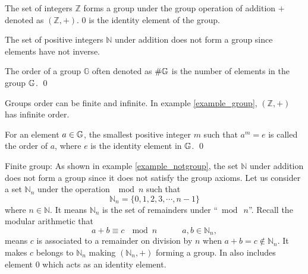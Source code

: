 \begin{example} \label{example_group}
	The set of integers $\mathbb{Z}$ forms a group under the group operation of addition $+$ denoted as $(\mathbb{Z},+)$. $0$ is the identity element of the group.
\end{example}
\begin{example}\label{example_notgroup}
	The set of positive integers $\mathbb{N}$ under addition does not form a group since elements have not inverse.
\end{example}
\begin{definition}\hspace{0em}
	The order of a group $\mathbb{G}$  often denoted as $\#\mathbb{G}\index{group}$ is the number of elements in the group $\mathbb{G}\index{group}$.
	\qed
\end{definition}

\begin{remark}
	Groups order can be finite and infinite. In example \ref{example_group}, $(\mathbb{Z},+)$ has infinite order.
\end{remark}

\begin{definition}
	For an element $a\in\mathbb{G}\index{group}$, the smallest positive integer $m$ such that $a^{m}=e$ is called the order of $a$, where $e$ is the identity element in $\mathbb{G}\index{group}$.
	\qed
\end{definition}

\begin{example}{Finite group:   } \label{definition_finite_group}
	As shown in example \ref{example_notgroup}, the set $\mathbb{N}$ under addition does not form a group since it does not satisfy the group axioms. 
	Let us consider a set $\mathbb{N}_{n}$ under the operation $\mod n$  such that 
	$$ \mathbb{N}_{n} = \{0,1,2,3, \cdots, n-1\}$$
	where $n \in \mathbb{N}$.
	It means $\mathbb{N}_{n}$ is the set of remainders under ``$\bmod\ n$''.
	Recall the modular arithmetic that 
	$$a+b\equiv c\ \ \bmod n\hspace{3em}a,b\in \mathbb{N}_{n},\label{Sum Definition}$$
	means $c$ is  associated to a remainder on division by $n$ when $a+b=c\notin\mathbb{N}_{n}$. 
	It makes $c$ belongs to $\mathbb{N}_{n}$ making $( \mathbb{N}_{n},+)$ forming a group.
	In also includes element $0$ which acts as an identity element.
\end{example}

